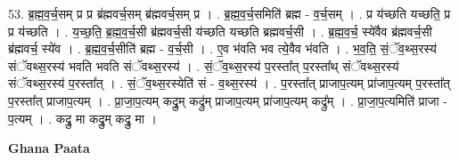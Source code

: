 \documentclass[17pt]{extarticle}
\begin{document}
53. ब्र॒ह्म॒व॒र्च॒सम् प्र प्र ब्र॑ह्मवर्च॒सम् ब्र॑ह्मवर्च॒सम् प्र । . ब्र॒ह्म॒व॒र्च॒समिति॑ ब्रह्म - व॒र्च॒सम् । . प्र य॑च्छति यच्छति॒ प्र प्र य॑च्छति । . य॒च्छ॒ति॒ ब्र॒ह्म॒व॒र्च॒सी ब्र॑ह्मवर्च॒सी य॑च्छति यच्छति ब्रह्मवर्च॒सी । . ब्र॒ह्म॒व॒र्च॒ स्ये॑वैव ब्र॑ह्मवर्च॒सी ब्र॑ह्मवर्च॒ स्ये॑व । . ब्र॒ह्म॒व॒र्च॒सीति॑ ब्रह्म - व॒र्च॒सी । . ए॒व भ॑वति भव त्ये॒वैव भ॑वति । . भ॒व॒ति॒ सं॒ॅव॒थ्स॒रस्य॑ संॅवथ्स॒रस्य॑ भवति भवति संॅवथ्स॒रस्य॑ । . सं॒ॅव॒थ्स॒रस्य॑ प॒रस्ता᳚त् प॒रस्ता᳚थ् संॅवथ्स॒रस्य॑ संॅवथ्स॒रस्य॑ प॒रस्ता᳚त् । . सं॒ॅव॒थ्स॒रस्येति॑ सं - व॒थ्स॒रस्य॑ । . प॒रस्ता᳚त् प्राजाप॒त्यम् प्रा॑जाप॒त्यम् प॒रस्ता᳚त् प॒रस्ता᳚त् प्राजाप॒त्यम् । . प्रा॒जा॒प॒त्यम् कद्रु॒म् कद्रु॑म् प्राजाप॒त्यम् प्रा॑जाप॒त्यम् कद्रु᳚म् । . प्रा॒जा॒प॒त्यमिति॑ प्राजा - प॒त्यम् । . कद्रु॒ मा कद्रु॒म् कद्रु॒ मा । \newline

\textbf{Ghana Paata } \newline
\end{document}
